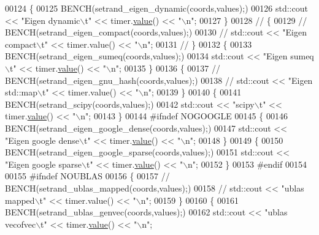 \begin{DoxyCode}
00124     \{
00125       BENCH(setrand\_eigen\_dynamic(coords,values);)
00126       std::cout << \textcolor{stringliteral}{"Eigen dynamic\(\backslash\)t"} << timer.\hyperlink{class_eigen_1_1_bench_timer_a26760f963ed8b64c126159bfea57735e}{value}() << \textcolor{stringliteral}{"\(\backslash\)n"};
00127     \}
00128 \textcolor{comment}{//     \{}
00129 \textcolor{comment}{//       BENCH(setrand\_eigen\_compact(coords,values);)}
00130 \textcolor{comment}{//       std::cout << "Eigen compact\(\backslash\)t" << timer.value() << "\(\backslash\)n";}
00131 \textcolor{comment}{//     \}}
00132     \{
00133       BENCH(setrand\_eigen\_sumeq(coords,values);)
00134       std::cout << \textcolor{stringliteral}{"Eigen sumeq\(\backslash\)t"} << timer.\hyperlink{class_eigen_1_1_bench_timer_a26760f963ed8b64c126159bfea57735e}{value}() << \textcolor{stringliteral}{"\(\backslash\)n"};
00135     \}
00136     \{
00137 \textcolor{comment}{//       BENCH(setrand\_eigen\_gnu\_hash(coords,values);)}
00138 \textcolor{comment}{//       std::cout << "Eigen std::map\(\backslash\)t" << timer.value() << "\(\backslash\)n";}
00139     \}
00140     \{
00141       BENCH(setrand\_scipy(coords,values);)
00142       std::cout << \textcolor{stringliteral}{"scipy\(\backslash\)t"} << timer.\hyperlink{class_eigen_1_1_bench_timer_a26760f963ed8b64c126159bfea57735e}{value}() << \textcolor{stringliteral}{"\(\backslash\)n"};
00143     \}
00144 \textcolor{preprocessor}{    #ifndef NOGOOGLE}
00145     \{
00146       BENCH(setrand\_eigen\_google\_dense(coords,values);)
00147       std::cout << \textcolor{stringliteral}{"Eigen google dense\(\backslash\)t"} << timer.\hyperlink{class_eigen_1_1_bench_timer_a26760f963ed8b64c126159bfea57735e}{value}() << \textcolor{stringliteral}{"\(\backslash\)n"};
00148     \}
00149     \{
00150       BENCH(setrand\_eigen\_google\_sparse(coords,values);)
00151       std::cout << \textcolor{stringliteral}{"Eigen google sparse\(\backslash\)t"} << timer.\hyperlink{class_eigen_1_1_bench_timer_a26760f963ed8b64c126159bfea57735e}{value}() << \textcolor{stringliteral}{"\(\backslash\)n"};
00152     \}
00153 \textcolor{preprocessor}{    #endif}
00154 
00155 \textcolor{preprocessor}{    #ifndef NOUBLAS}
00156     \{
00157 \textcolor{comment}{//       BENCH(setrand\_ublas\_mapped(coords,values);)}
00158 \textcolor{comment}{//       std::cout << "ublas mapped\(\backslash\)t" << timer.value() << "\(\backslash\)n";}
00159     \}
00160     \{
00161       BENCH(setrand\_ublas\_genvec(coords,values);)
00162       std::cout << \textcolor{stringliteral}{"ublas vecofvec\(\backslash\)t"} << timer.\hyperlink{class_eigen_1_1_bench_timer_a26760f963ed8b64c126159bfea57735e}{value}() << \textcolor{stringliteral}{"\(\backslash\)n"};

\end{DoxyCode}
